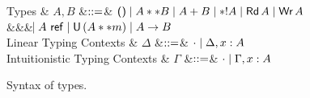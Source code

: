\begin{figure*}
  \begin{grammar}
    Types
    & $A,B$
    &$\mathrel{::=}$& $\textsf{()} \mathrel{\mid} A ** B \mathrel{\mid} A + B \mathrel{\mid} *! A \mathrel{\mid}
    \textsf{Rd}\,A \mathrel{\mid} \textsf{Wr}\,A$
    \\ &&& $\hspace{-1.02ex}\mathrel{\mid} A\ \text{\textsf{ref}} \mathrel{\mid} \textsf{U}\,(A ** m) \mathrel{\mid} A -> B$
    \\
    Linear Typing Contexts
    & $\Delta$
    &$\mathrel{::=}$& $\cdot \mathrel{\mid} \Delta,x:A$
    \\
    Intuitionistic Typing Contexts
    & $\Gamma$
    &$\mathrel{::=}$& $\cdot \mathrel{\mid} \Gamma,x:A$
  \end{grammar}
\caption{Syntax of types.}
\label{fig:syntax--types}
\end{figure*}
